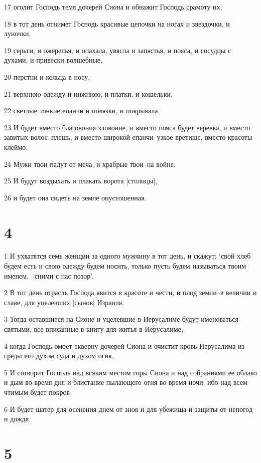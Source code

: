 \par 17 оголит Господь темя дочерей Сиона и обнажит Господь срамоту их;
\par 18 в тот день отнимет Господь красивые цепочки на ногах и звездочки, и луночки,
\par 19 серьги, и ожерелья, и опахала, увясла и запястья, и пояса, и сосудцы с духами, и привески волшебные,
\par 20 перстни и кольца в носу,
\par 21 верхнюю одежду и нижнюю, и платки, и кошельки,
\par 22 светлые тонкие епанчи и повязки, и покрывала.
\par 23 И будет вместо благовония зловоние, и вместо пояса будет веревка, и вместо завитых волос--плешь, и вместо широкой епанчи--узкое вретище, вместо красоты--клеймо.
\par 24 Мужи твои падут от меча, и храбрые твои--на войне.
\par 25 И будут воздыхать и плакать ворота [столицы],
\par 26 и будет она сидеть на земле опустошенная.

\chapter{4}

\par 1 И ухватятся семь женщин за одного мужчину в тот день, и скажут: `свой хлеб будем есть и свою одежду будем носить, только пусть будем называться твоим именем, --сними с нас позор'.
\par 2 В тот день отрасль Господа явится в красоте и чести, и плод земли--в величии и славе, для уцелевших [сынов] Израиля.
\par 3 Тогда оставшиеся на Сионе и уцелевшие в Иерусалиме будут именоваться святыми, все вписанные в книгу для житья в Иерусалиме,
\par 4 когда Господь омоет скверну дочерей Сиона и очистит кровь Иерусалима из среды его духом суда и духом огня.
\par 5 И сотворит Господь над всяким местом горы Сиона и над собраниями ее облако и дым во время дня и блистание пылающего огня во время ночи; ибо над всем чтимым будет покров.
\par 6 И будет шатер для осенения днем от зноя и для убежища и защиты от непогод и дождя.

\chapter{5}

